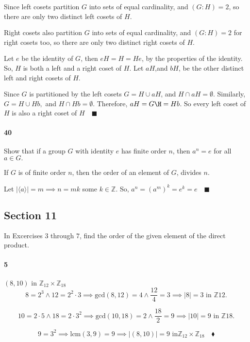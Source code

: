 \documentclass{article}
\newcommand\Z{\mathbb{Z}}
\begin{document}

Since left cosets partition $G$ into sets of equal
cardinality, and $(G:H) = 2$, so there are only two distinct left cosets of $H$.

Right cosets  also partition $G$ into sets of equal
cardinality, and $(G:H) = 2$ for right cosets too, so there are only
two distinct right cosets of $H$.

Let $e$ be the identity of $G$, then $eH = H = He$, by the properties
of the identity. So, $H$ is both a left and a right coset of $H$. Let
$aH$,and $bH$, be the other distinct left and right cosets of $H$.

Since $G$ is partitioned by the left cosets $G = H \cup aH$, and
$H\cap aH = \emptyset$. Similarly, $G = H \cup Hb,$ and $H\cap Hb
=\emptyset$. Therefore, $  aH =G\H = Hb$. So every left coset of $H$
is also a right coset of $H \quad \blacksquare$

\paragraph{40} Show that if a group $G$ with identity $e$ has finite
order $n$, then $a^n = e$ for all $a \in G.$


If $G$ is of finite order $n$, then the order of an element of $G$,
divides $n$.

Let $|\langle a \rangle| = m \implies n = mk$ some $k\in\Z$.
So, $a^n = (a^m)^k = e^k = e\quad \blacksquare$

\subsection*{Section 11}

In Excercises $3$ through $7$, find the order of the given element of
the direct product.

\paragraph{5} $(8,10)$ in $\Z_{12}\times\Z_{18}$
$$ 8 = 2^3\land 12 = 2^2\cdot3 \implies \text{gcd}(8,12) = 4 \land
\frac{12}{4} = 3 \implies |8|= 3 \text{ in }\Z{12}.$$

$$ 10 = 2\cdot 5\land 18 = 2\cdot3^2 \implies \text{gcd}(10, 18) = 2 \land
\frac{18}{2} = 9 \implies |10|= 9 \text{ in }\Z{18}.$$

$$9 = 3^2 \implies \text{lcm}(3,9)= 9 \implies |(8,10)| = 9 \text{ in
}\Z_{12}\times\Z_{18}\quad \blacklozenge$$
\end{document}
